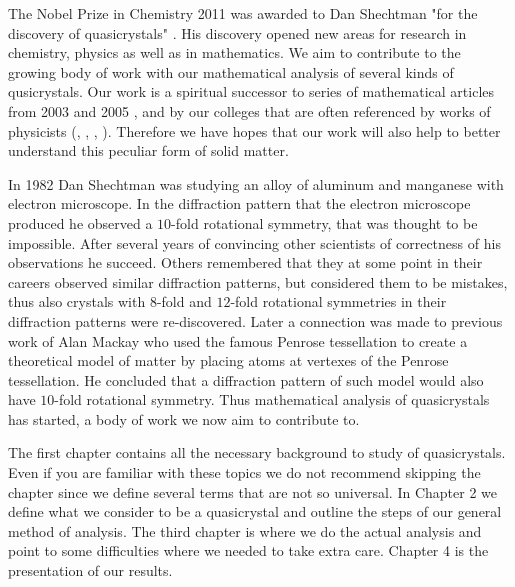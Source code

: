 \documentclass[text.tex]{subfiles}
\begin{document}
The Nobel Prize in Chemistry 2011 was awarded to Dan Shechtman "for the discovery of quasicrystals" \cite{nobel}. His discovery opened new areas for research in chemistry, physics as well as in mathematics. We aim to contribute to the growing body of work with our mathematical analysis of several kinds of qusicrystals. Our work is a spiritual successor to series of mathematical articles from 2003 and 2005 \cite{classification}, \cite{classificationII} and \cite{classificationIII} by our colleges that are often referenced by works of physicists (\cite{mention01}, \cite{mention02}, \cite{mention03}, \cite{mention04}). Therefore we have hopes that our work will also help to better understand this peculiar form of solid matter. 

In 1982 Dan Shechtman was studying an alloy of aluminum and manganese with electron microscope. In the diffraction pattern that the electron microscope produced he observed a $10$-fold rotational symmetry, that was thought to be impossible. After several years of convincing other scientists of correctness of his observations he succeed. Others remembered that they at some point in their careers observed similar diffraction patterns, but considered them to be mistakes, thus also crystals with $8$-fold and $12$-fold rotational symmetries in their diffraction patterns were re-discovered. Later a connection was made to previous work of Alan Mackay who used the famous Penrose tessellation to create a theoretical model of matter by placing atoms at vertexes of the Penrose tessellation. He concluded that a diffraction pattern of such model would also have $10$-fold rotational symmetry. Thus mathematical analysis of quasicrystals has started, a body of work we now aim to contribute to. 

The first chapter contains all the necessary background to study of quasicrystals. Even if you are familiar with these topics we do not recommend skipping the chapter since we define several terms that are not so universal. In Chapter 2 we define what we consider to be a quasicrystal and outline the steps of our general method of analysis. The third chapter is where we do the actual analysis and point to some difficulties where we needed to take extra care. Chapter 4 is the presentation of our results. 
\end{document}
